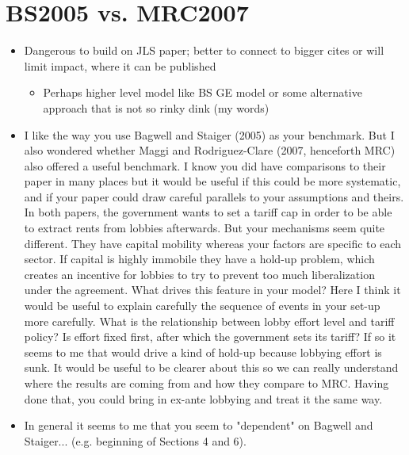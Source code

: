 \documentclass[12pt]{article}
\begin{document}
\section{BS2005 vs. MRC2007}
		\begin{itemize}
			\item Dangerous to build on JLS paper; better to connect to bigger cites or will limit impact, where it can be published
				\begin{itemize}
					\item Perhaps higher level model like BS GE model or some alternative approach that is not so rinky dink (my words)
				\end{itemize}
			\item I like the way you use Bagwell and Staiger (2005) as your benchmark.  But I also wondered whether Maggi and Rodriguez-Clare (2007, henceforth MRC) also offered a useful benchmark.  I know you did have comparisons to their paper in many places but it would be useful if this could be more systematic, and if your paper could draw careful parallels to your assumptions and theirs.  In both papers, the government wants to set a tariff cap in order to be able to extract rents from lobbies afterwards.  But your mechanisms seem quite different.  They have capital mobility whereas your factors are specific to each sector.  If capital is highly immobile they have a hold-up problem, which creates an incentive for lobbies to try to prevent too much liberalization under the agreement.  What drives this feature in your model?  Here I think it would be useful to explain carefully the sequence of events in your set-up more carefully.  What is the relationship between lobby effort level and tariff policy?  Is effort fixed first, after which the government sets its tariff?  If so it seems to me that would drive a kind of hold-up because lobbying effort is sunk.  It would be useful to be clearer about this so we can really understand where the results are coming from and how they compare to MRC.  Having done that, you could bring in ex-ante lobbying and treat it the same way. 
			\item In general it seems to me that you seem to "dependent" on Bagwell and Staiger... (e.g. beginning of Sections 4 and 6).
		\end{itemize}
\end{document}
